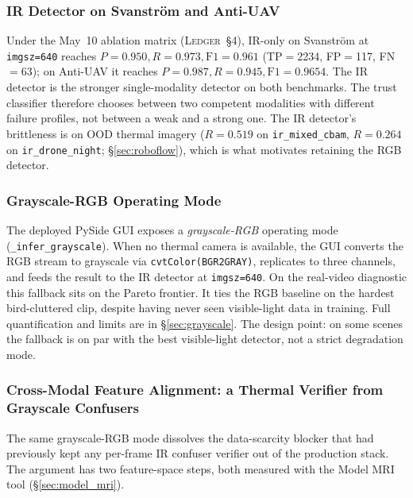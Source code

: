 \subsubsection{IR Detector on Svanstr\"om and Anti-UAV}

Under the May~10 ablation matrix (\textsc{Ledger}~\S4), IR-only on Svanstr\"om at \texttt{imgsz=640} reaches $P=0.950, R=0.973, \text{F1}=0.961$ (TP$=$2234, FP$=$117, FN$=$63); on Anti-UAV it reaches $P=0.987, R=0.945, \text{F1}=0.9654$. The IR detector is the stronger single-modality detector on both benchmarks. The trust classifier therefore chooses between two competent modalities with different failure profiles, not between a weak and a strong one. The IR detector's brittleness is on OOD thermal imagery ($R=0.519$ on \texttt{ir\_mixed\_cbam}, $R=0.264$ on \texttt{ir\_drone\_night}; \S\ref{sec:roboflow}), which is what motivates retaining the RGB detector.

\subsubsection{Grayscale-RGB Operating Mode}
\label{sec:ir_grayscale_mode}

The deployed PySide GUI exposes a \emph{grayscale-RGB} operating mode (\texttt{\_infer\_grayscale}). When no thermal camera is available, the GUI converts the RGB stream to grayscale via \texttt{cvtColor(BGR2GRAY)}, replicates to three channels, and feeds the result to the IR detector at \texttt{imgsz=640}. On the real-video diagnostic this fallback sits on the Pareto frontier. It ties the RGB baseline on the hardest bird-cluttered clip, despite having never seen visible-light data in training. Full quantification and limits are in \S\ref{sec:grayscale}. The design point: on some scenes the fallback is on par with the best visible-light detector, not a strict degradation mode.

\subsubsection{Cross-Modal Feature Alignment: a Thermal Verifier from Grayscale Confusers}
\label{sec:ir_xmodal_verifier}

The same grayscale-RGB mode dissolves the data-scarcity blocker that had previously kept any per-frame IR confuser verifier out of the production stack. The argument has two feature-space steps, both measured with the Model MRI tool (\S\ref{sec:model_mri}).

